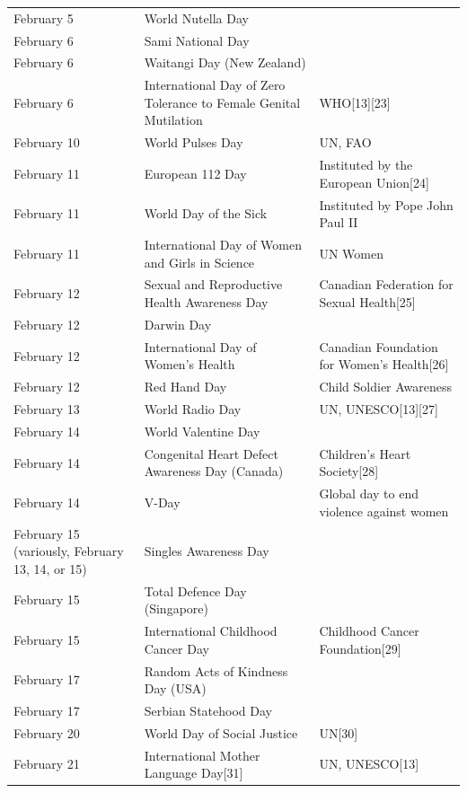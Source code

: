 \documentclass[
  openany]{book}
\begin{document}
\begin{longtable}[t]{>{\raggedright\arraybackslash}p{8em}>{\raggedright\arraybackslash}p{20em}>{\raggedright\arraybackslash}p{12em}}
February 5 & World Nutella Day & \\
\rowcolor{gray!6}  February 6 & Sami National Day & \\
February 6 & Waitangi Day (New Zealand) & \\
\rowcolor{gray!6}  February 6 & International Day of Zero Tolerance to Female Genital Mutilation & WHO[13][23]\\
\addlinespace
February 10 & World Pulses Day & UN, FAO\\
\rowcolor{gray!6}  February 11 & European 112 Day & Instituted by the European Union[24]\\
February 11 & World Day of the Sick & Instituted by Pope John Paul II\\
\rowcolor{gray!6}  February 11 & International Day of Women and Girls in Science & UN Women\\
February 12 & Sexual and Reproductive Health Awareness Day & Canadian Federation for Sexual Health[25]\\
\addlinespace
\rowcolor{gray!6}  February 12 & Darwin Day & \\
February 12 & International Day of Women's Health & Canadian Foundation for Women's Health[26]\\
\rowcolor{gray!6}  February 12 & Red Hand Day & Child Soldier Awareness\\
February 13 & World Radio Day & UN, UNESCO[13][27]\\
\rowcolor{gray!6}  February 14 & World Valentine Day & \\
\addlinespace
February 14 & Congenital Heart Defect Awareness Day (Canada) & Children's Heart Society[28]\\
\rowcolor{gray!6}  February 14 & V-Day & Global day to end violence against women\\
February 15 (variously, February 13, 14, or 15) & Singles Awareness Day & \\
\rowcolor{gray!6}  February 15 & Total Defence Day (Singapore) & \\
February 15 & International Childhood Cancer Day & Childhood Cancer Foundation[29]\\
\addlinespace
\rowcolor{gray!6}  February 17 & Random Acts of Kindness Day (USA) & \\
February 17 & Serbian Statehood Day & \\
\rowcolor{gray!6}  February 20 & World Day of Social Justice & UN[30]\\
February 21 & International Mother Language Day[31] & UN, UNESCO[13]\\

\end{longtable}
\end{document}
